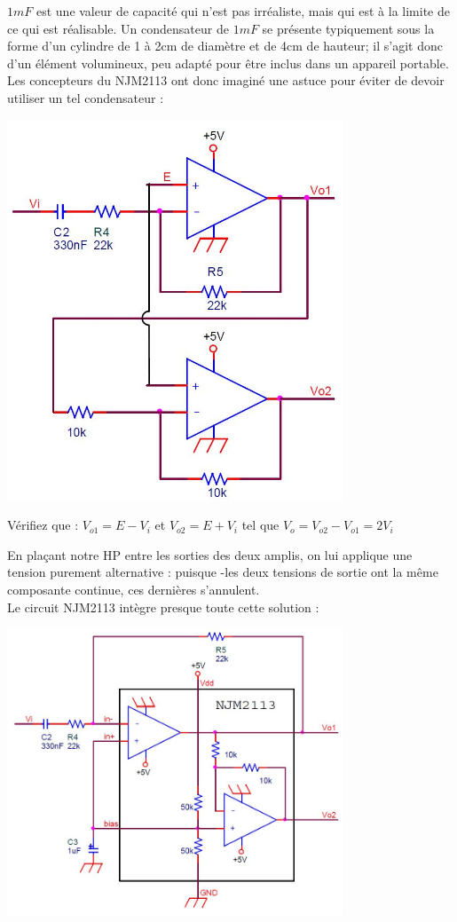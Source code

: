 $1mF$ est une valeur de capacité qui n'est pas irréaliste, mais qui est à la limite de ce qui est réalisable. Un condensateur de $1mF$ se présente typiquement sous la forme d'un cylindre de 1 à 2cm de diamètre et de 4cm de hauteur; il s'agit donc d'un élément volumineux, peu adapté pour être inclus dans un appareil portable.\\
Les concepteurs du NJM2113 ont donc imaginé une astuce pour éviter de devoir utiliser un tel condensateur :
\begin{center}
\includegraphics[width=10cm]{figures/AOPetage32}
\end{center}

{
Vérifiez que : $V_{o1}=E-V_i$ et $V_{o2}=E+V_i$ tel que $V_o=V_{o2}-V_{o1}=2V_i$
}
{}

En plaçant notre HP entre les sorties des deux amplis, on lui applique une tension purement alternative : puisque -les deux tensions de sortie ont la même composante continue, ces dernières s'annulent.\\
Le circuit NJM2113 intègre presque toute cette solution :
\begin{center}
\includegraphics[width=10cm]{figures/NJM}
\end{center}

